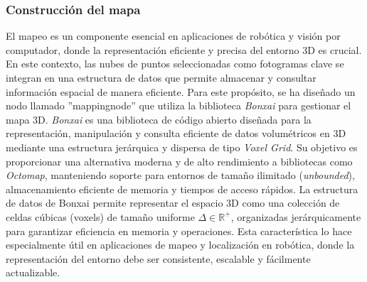 \documentclass[12pt, a4paper, twoside]{article}
\begin{document}
\subsubsection{Construcción del mapa}
El mapeo es un componente esencial en aplicaciones de robótica y visión por computador, donde la representación eficiente y precisa del entorno 3D es crucial.
En este contexto, las nubes de puntos seleccionadas como fotogramas clave se integran en una estructura de datos que permite almacenar y consultar información espacial 
de manera eficiente. Para este propósito, se ha diseñado un nodo llamado ''mapping\textunderscore node'' que utiliza la biblioteca \textit{Bonxai}\cite{faconti2024bonxai} para gestionar el mapa 3D.
\textit{Bonxai}\cite{faconti2024bonxai} es una biblioteca de código abierto diseñada para la representación, manipulación y consulta eficiente de datos volumétricos en 3D mediante una estructura 
jerárquica y dispersa de tipo \textit{Voxel Grid}. Su objetivo es proporcionar una alternativa moderna y de alto rendimiento a bibliotecas como \textit{Octomap}, 
manteniendo soporte para entornos de tamaño ilimitado (\textit{unbounded}), almacenamiento eficiente de memoria y tiempos de acceso rápidos.\newline
La estructura de datos de Bonxai\cite{faconti2024bonxai} permite representar el espacio 3D como una colección de celdas cúbicas (voxels) de tamaño uniforme \(\Delta \in \mathbb{R}^{+}\), 
organizadas jerárquicamente para garantizar eficiencia en memoria y operaciones. Esta característica lo hace especialmente útil en aplicaciones de mapeo y localización en robótica, 
donde la representación del entorno debe ser consistente, escalable y fácilmente actualizable.
\end{document}
